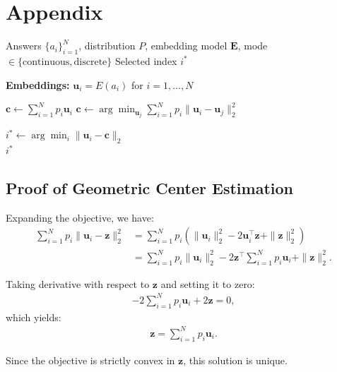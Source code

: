 \section{Appendix}\label{sec:app}

\begin{algorithm}[h]
\caption{Best-of-$N$ Selection with Radial Consensus Score (RCS)}
\label{alg:rds}
\begin{algorithmic}[1]
\Require Answers $\{a_i\}_{i=1}^N$, distribution $P$, embedding model $\mathbf{E}$, mode $\in \{\text{continuous}, \text{discrete}\}$
\Ensure Selected index $i^*$

\Statex \textbf{Embeddings:} $\mathbf{u}_i = E(a_i)$ \quad for $i=1,\dots,N$

    \State $\mathbf{c} \leftarrow \sum_{i=1}^N p_i \mathbf{u}_i$
\Else
    \State $\mathbf{c} \leftarrow \arg\min_{\mathbf{u}_j} \sum_{i=1}^N p_i \|\mathbf{u}_i - \mathbf{u}_j\|_2^2$
\EndIf

\State $i^* \leftarrow \arg\min_i \|\mathbf{u}_i - \mathbf{c}\|_2$\\
\Return $i^*$
\end{algorithmic}
\end{algorithm}

\subsection{Proof of Geometric Center Estimation}\label{app:proof_center}

Expanding the objective, we have:
\begin{align}
\sum_{i=1}^N p_i \|\mathbf{u}_i - \mathbf{z}\|_2^2
&= \sum_{i=1}^N p_i \left( \|\mathbf{u}_i\|_2^2 - 2 \mathbf{u}_i^\top \mathbf{z} + \|\mathbf{z}\|_2^2 \right) \\
&= \sum_{i=1}^N p_i \|\mathbf{u}_i\|_2^2 - 2 \mathbf{z}^\top \sum_{i=1}^N p_i \mathbf{u}_i + \|\mathbf{z}\|_2^2.
\end{align}

Taking derivative with respect to $\mathbf{z}$ and setting it to zero:
\begin{align}
-2 \sum_{i=1}^N p_i \mathbf{u}_i + 2 \mathbf{z} = 0,
\end{align}
which yields:
\begin{align}
\mathbf{z} = \sum_{i=1}^N p_i \mathbf{u}_i.
\end{align}

Since the objective is strictly convex in $\mathbf{z}$, this solution is unique.


